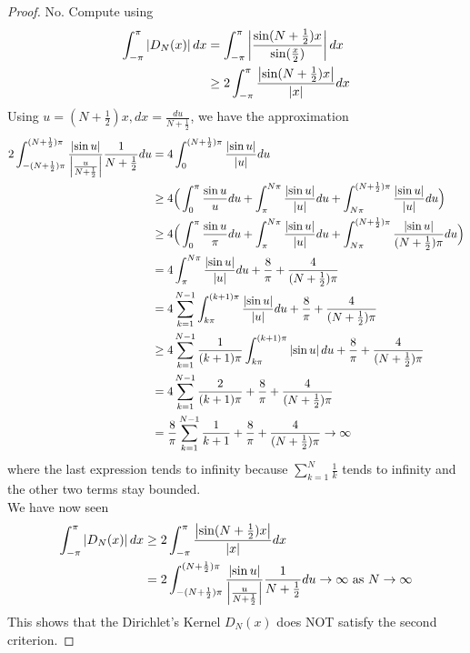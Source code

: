 \documentclass{report}
\begin{document}
\begin{proof}
No. Compute using 
\begin{align*}
\int_{-\pi}^{\pi}\left|D_N(x)\right|dx&=\int_{-\pi}^{\pi}\left|\frac{\sin (N+\frac{1}{2})x}{\sin (\frac{x}{2})}\right|dx\\
&\geq 2\int_{-\pi}^{\pi} \frac{\left|\sin (N+\frac{1}{2})x\right|}{\left|x\right|}dx
\end{align*}
Using $u=(N+\frac{1}{2})x,dx=\frac{du}{N+\frac{1}{2}}$, we have the approximation
\begin{align*}
  2\int_{-(N+\frac{1}{2})\pi}^{(N+\frac{1}{2})\pi} \frac{\left|\sin u\right|}{\left|\frac{u}{N+\frac{1}{2}}\right|}\frac{1}{N+\frac{1}{2}}du&=4\int_{0}^{(N+\frac{1}{2})\pi} \frac{\left|\sin u\right|}{\left|u\right|}du\\
&\geq 4\Big(\int_0^{\pi}\frac{\sin u}{u}du+\int_{\pi}^{N\pi} \frac{\left|\sin u\right| }{\left|u\right| }du+\int_{N\pi}^{(N+\frac{1}{2})\pi} \frac{\left|\sin u\right|}{\left|u\right|}du \Big)\\
&\geq 4\Big(\int_0^{\pi}\frac{\sin u}{\pi}du+\int_{\pi}^{N\pi} \frac{\left|\sin u\right| }{\left|u\right| }du+\int_{N\pi}^{(N+\frac{1}{2})\pi} \frac{\left|\sin u\right|}{(N+\frac{1}{2})\pi}du \Big)\\
&= 4\int_{\pi}^{N\pi} \frac{\left|\sin u\right|}{\left|u\right|}du+\frac{8}{\pi}+\frac{4}{(N+\frac{1}{2})\pi} \\
&=4\sum_{k=1}^{N-1}\int_{k\pi}^{(k+1)\pi } \frac{\left|\sin u\right|}{\left|u\right|}du+\frac{8}{\pi}+\frac{4}{(N+\frac{1}{2})\pi}\\
&\geq 4 \sum_{k=1}^{N-1}\frac{1}{(k+1)\pi} \int_{k\pi}^{(k+1)\pi} \left|\sin u\right|du+\frac{8}{\pi}+\frac{4}{(N +\frac{1}{2})\pi}\\
&=4\sum_{k=1}^{N-1}\frac{2}{(k+1)\pi}+\frac{8}{\pi}+\frac{4}{(N+\frac{1}{2})\pi}\\
&=\frac{8}{\pi}\sum_{k=1}^{N-1}\frac{1}{k+1}+\frac{8}{\pi}+\frac{4}{(N+\frac{1}{2})\pi}\to \infty
\end{align*}
where the last expression tends to infinity because $\sum_{k=1}^{N}\frac{1}{k}$ tends to infinity and the other two terms stay bounded.\\

We have now seen 
\begin{align*}
  \int_{-\pi}^{\pi}\left|D_N(x)\right|dx&\geq 2\int_{-\pi}^{\pi} \frac{\left|\sin (N+\frac{1}{2})x\right|}{\left|x\right|}dx\\
  &= 2\int_{-(N+\frac{1}{2})\pi}^{(N+\frac{1}{2})\pi} \frac{\left|\sin u\right|}{\left|\frac{u}{N+\frac{1}{2}}\right|}\frac{1}{N+\frac{1}{2}}du \to \infty\text{ as }N\to \infty
\end{align*}
This shows that the Dirichlet's Kernel $D_N(x)$ does NOT satisfy the second criterion. 
\end{proof}
\end{document}
